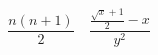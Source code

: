 \documentclass{article}
\begin{document}
\[
  \frac{n(n+1)}{2} \quad \frac{\frac{\sqrt{x}+1}{2}-x}{y^2} 
\]
\end{document}
